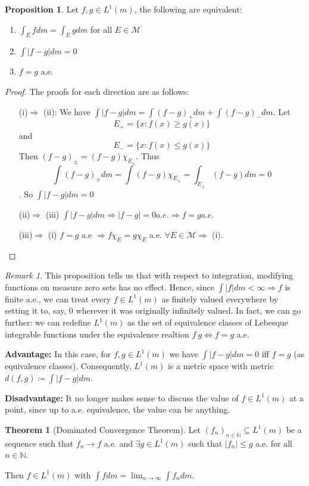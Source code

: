 \documentclass{article}
\theoremstyle{definition}
\newtheorem{prop}{Proposition}[section]
\newtheorem{theorem}{Theorem}[section]
\theoremstyle{remark}
\newtheorem*{remark}{Remark}
\theoremstyle{remark}
\def\scriptm{{\mathcal M}}
\def\naturals{{\mathbb N}}
\begin{document}
\begin{prop}
Let $f, g \in L^1(m)$, the following are equivalent:
\begin{enumerate}
	\item $\int_E f dm = \int_E g dm$ for all $E \in \scriptm$
	\item $\int |f - g| dm = 0$
	\item $f = g$ a.e.
\end{enumerate}
\end{prop}
\begin{proof} The proofs for each direction are as follows:
\begin{enumerate}
	\item[(i)$\Rightarrow$ (ii):] We have $\int |f -g| dm = \int (f - g)_+ dm + \int (f-g)_- dm$. Let
	$$E_{+} = \{x : f(x) \geq g(x)\}$$
	and $$E_{-} = \{x : f(x) \leq g(x)\}$$
	Then $(f-g)_{\pm} = (f-g)\chi_{E_\pm}$. Thus
	$$\int (f -g)_\pm dm = \int (f-g)\chi_{E_\pm} = \int_{E_\pm} (f-g) dm = 0$$. So $\int |f - g| dm = 0$ 
	\item[(ii)$\Rightarrow$ (iii)] $\int |f - g| dm \Rightarrow |f - g| = 0 a.e. \Rightarrow f = g a.e.$
	\item[(iii)$\Rightarrow$ (i)] $f = g$ a.e $\Rightarrow f\chi_E = g\chi_E$ a.e. $\forall E \in \scriptm \Rightarrow$ (i).
\end{enumerate}
\end{proof}
\begin{remark}
This proposition tells us that with respect to integration, modifying functions on measure zero sets has no effect. Hence, since $\int |f| dm < \infty \Rightarrow f$ is finite a.e., we can treat every $f \in L^1(m)$ as finitely valued everywhere by setting it to, say, 0 wherever it was originally infinitely valued. In fact, we can go further: we can redefine $L^1(m)$ as the set of equivalence classes of Lebesque integrable functions under the equivalence realtion $f ~ g \Leftrightarrow f =g$ a.e.

\textbf{Advantage:} In this case, for $f,g\in L^1(m)$ we have $\int |f -g | dm = 0$ iff $f = g$ (as equivalence classes). Consequently, $L^1(m)$ is a metric space with metric $d(f, g) \coloneqq \int|f-g| dm$. 

\textbf{Disadvantage:} It no longer makes sense to discuss the value of $f\in L^1(m)$ at a point, since up to a.e. equivalence, the value can be anything.
\end{remark}
\begin{theorem}[Dominated Convergence Theorem]
Let $(f_n)_{n\in\naturals}\subseteq L^1(m)$ be a sequence such that $f_n \to f$ a.e. and $\exists g\in L^1(m)$ such that $|f_n| \leq g$ a.e. for all $n\in\naturals$. 

Then $f \in L^1(m)$ with $\int fdm = \lim_{n\to\infty} \int f_n dm$.
\end{theorem}
\end{document}
